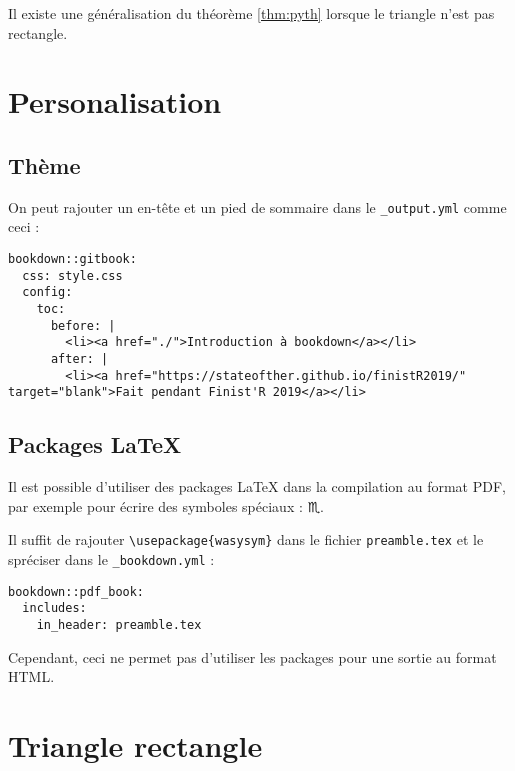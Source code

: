 \documentclass[]{book}
\theoremstyle{definition}
\theoremstyle{definition}
\theoremstyle{definition}
\theoremstyle{remark}
\let\BeginKnitrBlock\begin \let\EndKnitrBlock\end
\begin{document}
\BeginKnitrBlock{remark}[Al-Kashi]
\iffalse{} {Remark (Al-Kashi). } \fi{}Il existe une généralisation du théorème \ref{thm:pyth} lorsque le triangle n'est pas rectangle.
\EndKnitrBlock{remark}

\hypertarget{personalisation}{%
\chapter{Personalisation}\label{personalisation}}

\hypertarget{theme}{%
\section{Thème}\label{theme}}

On peut rajouter un en-tête et un pied de sommaire dans le \texttt{\_output.yml} comme ceci :

\begin{verbatim}
bookdown::gitbook:
  css: style.css
  config:
    toc:
      before: |
        <li><a href="./">Introduction à bookdown</a></li>
      after: |
        <li><a href="https://stateofther.github.io/finistR2019/" target="blank">Fait pendant Finist'R 2019</a></li>
\end{verbatim}

\hypertarget{packages-latex}{%
\section{Packages LaTeX}\label{packages-latex}}

Il est possible d'utiliser des packages LaTeX dans la compilation au format PDF, par exemple pour écrire des symboles spéciaux : \(\scorpio\).

Il suffit de rajouter \texttt{\textbackslash{}usepackage\{wasysym\}} dans le fichier \texttt{preamble.tex} et le spréciser dans le \texttt{\_bookdown.yml} :

\begin{verbatim}
bookdown::pdf_book:
  includes:
    in_header: preamble.tex
\end{verbatim}

Cependant, ceci ne permet pas d'utiliser les packages pour une sortie au format HTML.

\hypertarget{appendix-appendices}{%
\appendix}


\hypertarget{triangle-rectangle}{%
\chapter{Triangle rectangle}\label{triangle-rectangle}}
\end{document}
